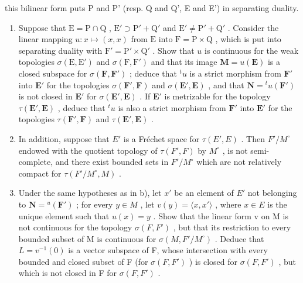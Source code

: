 this bilinear form puts P and P' (resp. Q and Q', E and E') in separating duality.

\begin{enumerate}
\def\labelenumi{\alph{enumi})}
\item
  Suppose that \(\mathrm{E} = \mathrm{P} \cap \mathrm{Q}\) , \(\mathrm{E}' \supset \mathrm{P}' + \mathrm{Q}'\) and \(\mathrm{E}' \neq \mathrm{P}' + \mathrm{Q}'\) . Consider the linear mapping \(u: x \mapsto (x, x)\) from \(\mathrm{E}\) into \(\mathrm{F} = \mathrm{P} \times \mathrm{Q}\) , which is put into separating duality with \(\mathrm{F}' = \mathrm{P}' \times \mathrm{Q}'\) . Show that \(u\) is continuous for the weak topologies \(\sigma(\mathrm{E}, \mathrm{E}')\) and \(\sigma(\mathrm{F}, \mathrm{F}')\) and that its image \(\mathbf{M} = u(\mathbf{E})\) is a closed subspace for \(\sigma(\mathbf{F}, \mathbf{F}')\) ; deduce that \(^t u\) is a strict morphism from \(\mathbf{F}'\) into \(\mathbf{E}'\) for the topologies \(\sigma(\mathbf{F}', \mathbf{F})\) and \(\sigma(\mathbf{E}', \mathbf{E})\) , and that \(\mathbf{N} = {}^{t}u(\mathbf{F}')\) is not closed in \(\mathbf{E}'\) for \(\sigma(\mathbf{E}', \mathbf{E})\) . If \(\mathbf{E}'\) is metrizable for the topology \(\tau(\mathbf{E}', \mathbf{E})\) , deduce that \(^t u\) is also a strict morphism from \(\mathbf{F}'\) into \(\mathbf{E}'\) for the topologies \(\tau(\mathbf{F}', \mathbf{F})\) and \(\tau(\mathbf{E}', \mathbf{E})\) .
\item
  In addition, suppose that \(E'\) is a Fréchet space for \(\tau(E', E)\) . Then \(F'/M^{\circ}\) endowed with the quotient topology of \(\tau(F', F)\) by \(M^{\circ}\) , is not semi-complete, and there exist bounded sets in \(F'/M^{\circ}\) which are not relatively compact for \(\tau(F'/M^{\circ}, M)\) .
\item
  Under the same hypotheses as in b), let \(x'\) be an element of \(E'\) not belonging to \(\mathbf{N} = {}^{u}(\mathbf{F}')\) ; for every \(y \in M\) , let \(v(y) = \langle x, x' \rangle\) , where \(x \in E\) is the unique element such that \(u(x) = y\) . Show that the linear form v on M is not continuous for the topology \(\sigma(F, F')\) , but that its restriction to every bounded subset of M is continuous for \(\sigma(M, F'/M^{\circ})\) . Deduce that \(L = v^{-1}(0)\) is a vector subspace of F, whose intersection with every bounded and closed subset of F (for \(\sigma(F, F')\) ) is closed for \(\sigma(F, F')\) , but which is not closed in F for \(\sigma(F, F')\) .
\end{enumerate}

